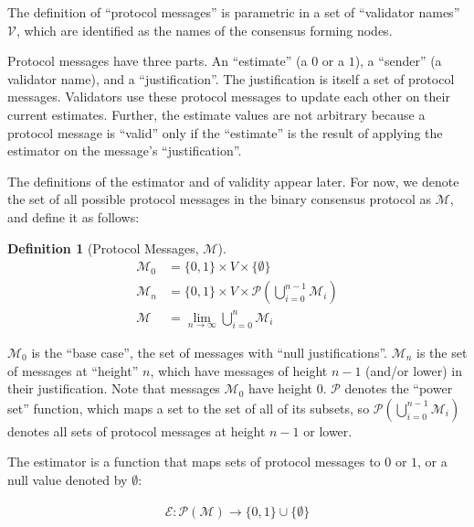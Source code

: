 \documentclass{article}
\theoremstyle{definition}
\newtheorem{defn}{Definition}[section]
\begin{document}
The definition of ``protocol messages'' is parametric in a set of ``validator names'' $\mathcal{V}$, which are identified as the names of the consensus forming nodes.

Protocol messages have three parts. An ``estimate'' (a $0$ or a $1$), a ``sender'' (a validator name), and a ``justification''. The justification is itself a set of protocol messages. Validators use these protocol messages to update each other on their current estimates. Further, the estimate values are not arbitrary because a protocol message is ``valid'' only if the ``estimate'' is the result of applying the estimator on the message's ``justification''.

The definitions of the estimator and of validity appear later. For now, we denote the set of all possible protocol messages in the binary consensus protocol as $\mathcal{M}$, and define it as follows:

\begin{defn}[Protocol Messages, $\mathcal{M}$]
\begin{equation*}
\begin{split}
    \mathcal{M}_0 &= \{0, 1\} \times V \times \{\emptyset\}\\
    \mathcal{M}_n &= \{0, 1\} \times V \times \mathcal{P}(\bigcup_{i=0}^{n-1} \mathcal{M}_i)\\
    \mathcal{M} &= \lim_{n \to \infty} \bigcup_{i=0}^{n} \mathcal{M}_i
\end{split}
\end{equation*}
\end{defn}

$\mathcal{M}_0$ is the ``base case'', the set of messages with ``null justifications''. $\mathcal{M}_n$ is the set of messages at ``height'' $n$, which have messages of height $n-1$ (and/or lower) in their justification. Note that messages $\mathcal{M}_0$ have height $0$. $\mathcal{P}$ denotes the ``power set'' function, which maps a set to the set of all of its subsets, so $\mathcal{P}(\bigcup_{i=0}^{n-1} \mathcal{M}_i)$ denotes all sets of protocol messages at height $n-1$ or lower.

The estimator is a function that maps sets of protocol messages to $0$ or $1$, or a null value denoted by $\emptyset$:

\begin{equation*}
\begin{split}
    \mathcal{E}:\mathcal{P}(\mathcal{M}) \to \{0, 1\} \cup \{\emptyset\}
\end{split}
\end{equation*}
\end{document}

